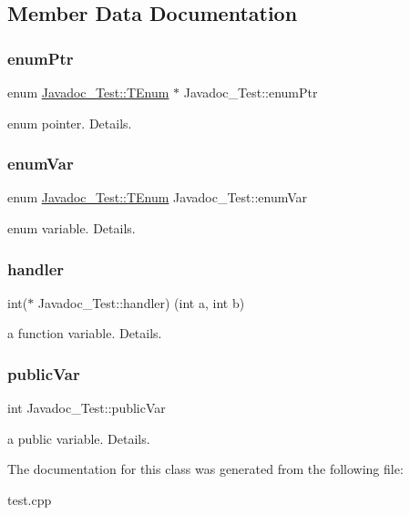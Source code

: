 \subsection{Member Data Documentation}
\hypertarget{class_javadoc___test_afa0fcc085875735f7f11b4c98dd984a8}{}\label{class_javadoc___test_afa0fcc085875735f7f11b4c98dd984a8} 
\subsubsection{\texorpdfstring{enum\+Ptr}{enumPtr}}
{\footnotesize\ttfamily enum \hyperlink{class_javadoc___test_ae37fd1cbf1af522674cbd33873b786a6}{Javadoc\+\_\+\+Test\+::\+T\+Enum}
       $\ast$ Javadoc\+\_\+\+Test\+::enum\+Ptr}

enum pointer. Details. \hypertarget{class_javadoc___test_a689558649150237b53a5c8ed89c996c2}{}\label{class_javadoc___test_a689558649150237b53a5c8ed89c996c2} 
\subsubsection{\texorpdfstring{enum\+Var}{enumVar}}
{\footnotesize\ttfamily enum \hyperlink{class_javadoc___test_ae37fd1cbf1af522674cbd33873b786a6}{Javadoc\+\_\+\+Test\+::\+T\+Enum}
        Javadoc\+\_\+\+Test\+::enum\+Var}

enum variable. Details. \hypertarget{class_javadoc___test_ace81a523a4eef44501a841a6d338832b}{}\label{class_javadoc___test_ace81a523a4eef44501a841a6d338832b} 
\subsubsection{\texorpdfstring{handler}{handler}}
{\footnotesize\ttfamily int($\ast$ Javadoc\+\_\+\+Test\+::handler) (int a, int b)}

a function variable. Details. \hypertarget{class_javadoc___test_a44a516fbc3a4865e2dcae34649c9df6a}{}\label{class_javadoc___test_a44a516fbc3a4865e2dcae34649c9df6a} 
\subsubsection{\texorpdfstring{public\+Var}{publicVar}}
{\footnotesize\ttfamily int Javadoc\+\_\+\+Test\+::public\+Var}

a public variable. Details. 

The documentation for this class was generated from the following file\+:\begin{DoxyCompactItemize}
\item 
test.\+cpp\end{DoxyCompactItemize}
